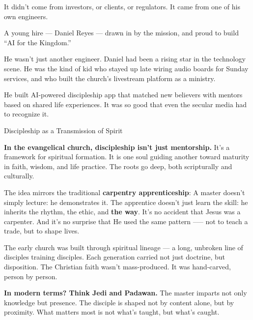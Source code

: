 It didn’t come from investors, or clients, or regulators.  It came from one of his own engineers.

A young hire --- Daniel Reyes --- drawn in by the mission, and proud to build “AI for the Kingdom.”

He wasn’t just another engineer. Daniel had been a rising star in the technology scene. He was the kind 
of kid who stayed up late wiring audio boards for Sunday services, and who built the church’s livestream 
platform as a ministry. 

He built AI-powered discipleship app that matched new believers with mentors based on shared life experiences.
It was so good that even the secular media had to recognize it.

\medskip

\begin{HistoricalSidebar}{Discipleship as a Transmission of Spirit}

  \textbf{In the evangelical church, discipleship isn’t just mentorship.}  
  It’s a framework for spiritual formation. It is one soul guiding another toward maturity in faith, 
  wisdom, and life practice.  The roots go deep, both scripturally and culturally.

  \medskip
  
  The idea mirrors the traditional \textbf{carpentry apprenticeship}:  
  A master doesn’t simply lecture: he demonstrates it.  
  The apprentice doesn’t just learn the skill: he inherits the rhythm, the ethic, and \textbf{the way}.  
  It’s no accident that Jesus was a carpenter. And it’s no surprise that He used the same pattern --— 
  not to teach a trade, but to shape lives.

  \medskip
  
  The early church was built through spiritual lineage — a long, unbroken line of disciples training disciples. 
  Each generation carried not just doctrine, but disposition. The Christian faith wasn’t mass-produced. It was 
  hand-carved, person by person.

  \medskip
  
  \textbf{In modern terms? Think Jedi and Padawan.}  
  The master imparts not only knowledge but presence. The disciple is shaped not by content alone, but by proximity.  
  What matters most is not what’s taught, but what’s caught.

  \medskip
  

\end{HistoricalSidebar}

